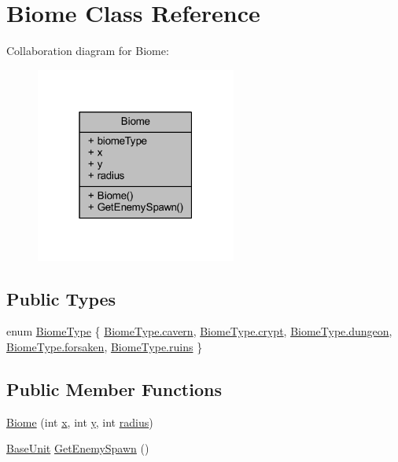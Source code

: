 \hypertarget{class_biome}{}\section{Biome Class Reference}
\label{class_biome}


Collaboration diagram for Biome\+:
\nopagebreak
\begin{figure}[H]
\begin{center}
\leavevmode
\includegraphics[width=187pt]{class_biome__coll__graph}
\end{center}
\end{figure}
\subsection*{Public Types}
\begin{DoxyCompactItemize}
\item 
enum \mbox{\hyperlink{class_biome_a7ddcfcc6d4e88c5eb73df6827df862da}{Biome\+Type}} \{ \newline
\mbox{\hyperlink{class_biome_a7ddcfcc6d4e88c5eb73df6827df862daa420041ed55a01779d7c409d007070961}{Biome\+Type.\+cavern}}, 
\mbox{\hyperlink{class_biome_a7ddcfcc6d4e88c5eb73df6827df862daaf7bd616b6c841d2538735f76d1e02b57}{Biome\+Type.\+crypt}}, 
\mbox{\hyperlink{class_biome_a7ddcfcc6d4e88c5eb73df6827df862daae0dc3209a149c3ae58feb149aef7cf3d}{Biome\+Type.\+dungeon}}, 
\mbox{\hyperlink{class_biome_a7ddcfcc6d4e88c5eb73df6827df862daa035c88a67814485689ec861c3685c316}{Biome\+Type.\+forsaken}}, 
\newline
\mbox{\hyperlink{class_biome_a7ddcfcc6d4e88c5eb73df6827df862daad5472cde0923fa02dce57c6a1bc9985c}{Biome\+Type.\+ruins}}
 \}
\end{DoxyCompactItemize}
\subsection*{Public Member Functions}
\begin{DoxyCompactItemize}
\item 
\mbox{\hyperlink{class_biome_a0c6561c6514566b5170802d7699e761a}{Biome}} (int \mbox{\hyperlink{class_biome_ae63d1400ef2eaa0c520bec593aa2e90d}{x}}, int \mbox{\hyperlink{class_biome_a3793ddae113d9c2b545a2dc7c6b96f3a}{y}}, int \mbox{\hyperlink{class_biome_a71b951bc82d85f930f9c6135a79a2bbc}{radius}})
\item 
\mbox{\hyperlink{class_base_unit}{Base\+Unit}} \mbox{\hyperlink{class_biome_abfb2b6d9c6ae23d0d7f247e10b568a9e}{Get\+Enemy\+Spawn}} ()
\end{DoxyCompactItemize}

